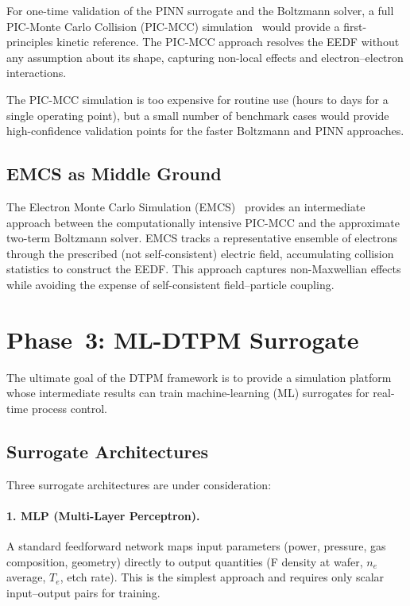 \documentclass[11pt,a4paper]{report}
\newcommand{\Te}{T_e}
\begin{document}
For one-time validation of the PINN surrogate and the Boltzmann solver, a full PIC-Monte Carlo Collision (PIC-MCC) simulation~\cite{Birdsall2004} would provide a first-principles kinetic reference.  The PIC-MCC approach resolves the EEDF without any assumption about its shape, capturing non-local effects and electron--electron interactions.

The PIC-MCC simulation is too expensive for routine use (hours to days for a single operating point), but a small number of benchmark cases would provide high-confidence validation points for the faster Boltzmann and PINN approaches.

\subsection{EMCS as Middle Ground}

The Electron Monte Carlo Simulation (EMCS)~\cite{Kawaguchi2022} provides an intermediate approach between the computationally intensive PIC-MCC and the approximate two-term Boltzmann solver.  EMCS tracks a representative ensemble of electrons through the prescribed (not self-consistent) electric field, accumulating collision statistics to construct the EEDF.  This approach captures non-Maxwellian effects while avoiding the expense of self-consistent field--particle coupling.


\section{Phase~3: ML-DTPM Surrogate}
\label{sec:phase3}

The ultimate goal of the DTPM framework is to provide a simulation platform whose intermediate results can train machine-learning (ML) surrogates for real-time process control.

\subsection{Surrogate Architectures}

Three surrogate architectures are under consideration:

\paragraph{1. MLP (Multi-Layer Perceptron).}  A standard feedforward network maps input parameters (power, pressure, gas composition, geometry) directly to output quantities (F density at wafer, $n_e$ average, $\Te$, etch rate).  This is the simplest approach and requires only scalar input--output pairs for training.
\end{document}
